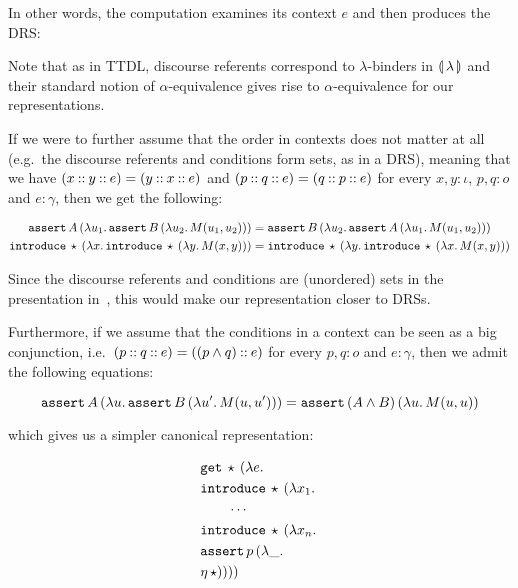In other words, the computation examines its context $e$ and then produces
the DRS:

\vspace{2mm}


\vspace{2mm}

Note that as in TTDL, discourse referents correspond to $\lambda$-binders
in $\llparenthesis \, \lambda \, \rrparenthesis$ and their standard notion of $\alpha$-equivalence
gives rise to $\alpha$-equivalence for our representations.

If we were to further assume that the order in contexts does not matter at
all (e.g.\ the discourse referents and conditions form sets, as in a DRS),
meaning that we have $(x \mathbin{::} y \mathbin{::} e) = (y \mathbin{::} x \mathbin{::} e)$ and
$(p \mathbin{::} q \mathbin{::} e) = (q \mathbin{::} p \mathbin{::} e)$ for every $x, y : \iota$,
$p, q : o$ and $e : \gamma$, then we get the following:

\begin{align*}
   \mathtt{assert}\,A\,(\lambda u_1.\, \mathtt{assert}\,B\,(\lambda u_2.\, M(u_1, u_2))) 
&= \mathtt{assert}\,B\,(\lambda u_2.\, \mathtt{assert}\,A\,(\lambda u_1.\, M(u_1, u_2))) \\
   \mathtt{introduce}\,\star\,(\lambda x.\, \mathtt{introduce}\,\star\,(\lambda y.\, M(x, y))) 
&= \mathtt{introduce}\,\star\,(\lambda y.\, \mathtt{introduce}\,\star\,(\lambda x.\, M(x, y)))
\end{align*}

Since the discourse referents and conditions are (unordered) sets in the
presentation in~\cite{kamp1993discourse}, this would make our
representation closer to DRSs.

Furthermore, if we assume that the conditions in a context can be seen as a
big conjunction, i.e.\ $(p \mathbin{::} q \mathbin{::} e) = ((p \land q) \mathbin{::} e)$ for
every $p, q : o$ and $e : \gamma$, then we admit the following equations:

$$
  \mathtt{assert}\,A\,(\lambda u.\, \mathtt{assert}\,B\,(\lambda u'.\, M(u, u'))) 
= \mathtt{assert}\,(A \land B)\,(\lambda u.\, M(u, u))
$$

which gives us a simpler canonical representation:

\begin{align*}
  &\mathtt{get}\,\star\,(\lambda e.\,  \\
  &\mathtt{introduce}\,\star\,(\lambda x_1.\,  \\
  &\qquad \cdots \\
  &\mathtt{introduce}\,\star\,(\lambda x_n.\,  \\
  &\mathtt{assert}\,p\,(\lambda \_.\,  \\
  &\eta\,\star))))
\end{align*}

